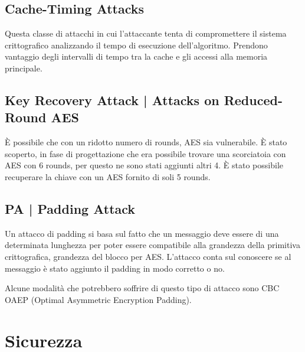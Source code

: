 \subsection{Cache-Timing Attacks}

   

\textsf{\small Questa classe di attacchi in cui l'attaccante tenta di compromettere il sistema crittografico analizzando il tempo di esecuzione dell'algoritmo. Prendono vantaggio degli intervalli di tempo tra la cache e gli accessi alla memoria principale.}

\subsection{Key Recovery Attack | Attacks on Reduced-Round AES}

   

\textsf{\small È possibile che con un ridotto numero di rounds, AES sia vulnerabile. È stato scoperto, in fase di progettazione che era possibile trovare una scorciatoia con AES con 6 rounds, per questo ne sono stati aggiunti altri 4. È stato possibile recuperare la chiave con un AES fornito di soli 5 rounds.}

\subsection{PA | Padding Attack}

   

\textsf{\small Un attacco di padding si basa sul fatto che un messaggio deve essere di una determinata lunghezza per poter essere compatibile alla grandezza della primitiva crittografica, grandezza del blocco per AES. L'attacco conta sul conoscere se al messaggio è stato aggiunto il padding in modo corretto o no.}

 

\textsf{\small Alcune modalità che potrebbero soffrire di questo tipo di attacco sono CBC OAEP (Optimal Asymmetric Encryption Padding).} %


\section{Sicurezza}

